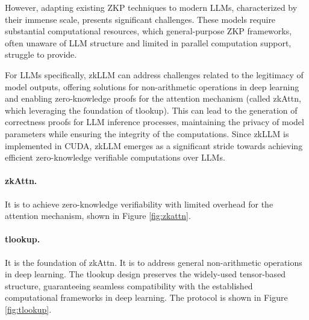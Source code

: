 \documentclass[lang=en]{sjtuarticle}
\begin{document}
However, adapting existing ZKP techniques to modern LLMs,
characterized by their immense scale, presents significant challenges.
These models require substantial computational resources,
which general-purpose ZKP frameworks,
often unaware of LLM structure and limited in parallel computation
support, struggle to provide.

For LLMs specifically, zkLLM \cite{sun2024zkllm} can address challenges related to the legitimacy of model outputs, offering solutions for non-arithmetic operations in deep learning and enabling zero-knowledge proofs for the attention mechanism (called \textsf{zkAttn}, which leveraging
the foundation of \textsf{tlookup}). This can lead to the generation of correctness proofs for LLM inference processes, maintaining the privacy of model parameters while ensuring the integrity of the computations. Since zkLLM is implemented in CUDA, zkLLM emerges as a significant stride towards achieving efficient
zero-knowledge verifiable computations over LLMs.

\paragraph{\textsf{zkAttn}.} It is to achieve zero-knowledge verifiability with limited overhead
for the attention mechanism, shown in Figure \ref{fig:zkattn}.

\paragraph{\textsf{tlookup}.} It is the foundation of \textsf{zkAttn}. It is to address
general non-arithmetic operations in deep learning. The
\textsf{tlookup} design preserves the widely-used tensor-based structure,
guaranteeing seamless compatibility with the established computational
frameworks in deep learning. The protocol is shown in Figure \ref{fig:tlookup}.
\end{document}
